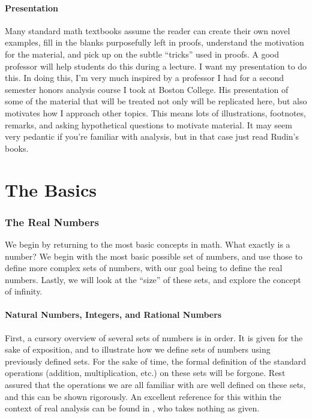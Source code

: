 \documentclass{article}
\theoremstyle{definition}
\begin{document}
	
	
	\subsection{Presentation}
	Many standard math textbooks assume the reader can create their own novel examples, fill in the blanks purposefully left in proofs, understand the motivation for the material, and pick up on the subtle ``tricks'' used in proofs. A good professor will help students do this during a lecture. I want my presentation to do this. In doing this, I'm very much inspired by a professor I had for a second semester honors analysis course I took at Boston College. His presentation of some of the material that will be treated not only will be replicated here, but also motivates how I approach other topics. This means lots of illustrations, footnotes, remarks, and asking hypothetical questions to motivate material. It may seem very pedantic if you're familiar with analysis, but in that case just read Rudin's books. 
	\newpage
	
	\part{The Basics}
	
	
	\section{The Real Numbers}
	We begin by returning to the most basic concepts in math. What exactly is a number? We begin with the most basic possible set of numbers, and use those to define more complex sets of numbers, with our goal being to define the real numbers. Lastly, we will look at the ``size'' of these sets, and explore the concept of infinity. 
	
	\subsection{Natural Numbers, Integers, and Rational Numbers}
	First, a cursory overview of several sets of numbers is in order. It is given for the sake of exposition, and to illustrate how we define sets of numbers using previously defined sets. For the sake of time, the formal definition of the standard operations (addition, multiplication, etc.) on these sets will be forgone. Rest assured that the operations we are all familiar with are well defined on these sets, and this can be shown rigorously. An excellent reference for this within the context of real analysis can be found in \cite{tao2006analysis}, who takes nothing as given. 
	
\end{document}
